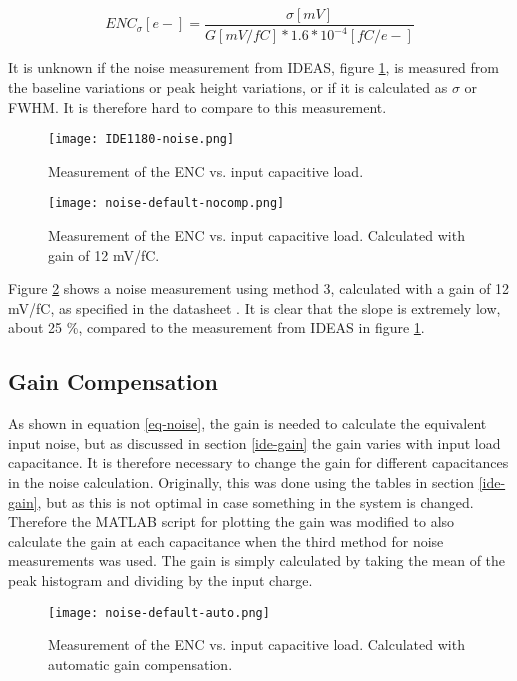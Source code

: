 \documentclass[../main/thesis.tex]{subfiles}
\begin{document}
\begin{equation}%
ENC_\sigma [e-] = \frac{\sigma [mV]}{G [mV/fC]*1.6*10^{-4} [fC/e-]}
\label{eq-noise}
\end{equation}

It is unknown if the noise measurement from IDEAS, figure \ref{fig-ide-noise}, is measured from the baseline variations or peak height variations, or if it is calculated as $\sigma$ or \gls{FWHM}. It is therefore hard to compare to this measurement. 

\begin{figure}%
	\centering
	\texttt{[image: IDE1180-noise.png]}
	\caption{Measurement of the \gls{ENC} vs. input capacitive load. \citep{IDE1180}}
	\label{fig-ide-noise}
\end{figure} 

\begin{figure}%
	\centering
	\texttt{[image: noise-default-nocomp.png]}
	\caption{Measurement of the \gls{ENC} vs. input capacitive load. Calculated with gain of 12 mV/fC.}
	\label{fig-noise-nocomp}
\end{figure} 

Figure \ref{fig-noise-nocomp} shows a noise measurement using method 3, calculated with a gain of 12 mV/fC, as specified in the datasheet \citep{IDE1180}. It is clear that the slope is extremely low, about 25 \%, compared to the measurement from IDEAS in figure \ref{fig-ide-noise}. 

\subsection{Gain Compensation}
\label{ide-noise-gain}

As shown in equation \ref{eq-noise}, the gain is needed to calculate the equivalent input noise, but as discussed in section \ref{ide-gain} the gain varies with input load capacitance. It is therefore necessary to change the gain for different capacitances in the noise calculation. Originally, this was done using the tables in section \ref{ide-gain}, but as this is not optimal in case something in the system is changed. Therefore the MATLAB script for plotting the gain was modified to also calculate the gain at each capacitance when the third method for noise measurements was used. The gain is simply calculated by taking the mean of the peak histogram and dividing by the input charge. 

\begin{figure}[h!] %
	\centering
	\texttt{[image: noise-default-auto.png]}
	\caption{Measurement of the \gls{ENC} vs. input capacitive load. Calculated with automatic gain compensation.}
	\label{fig-noise-auto}
\end{figure} 
\end{document}
